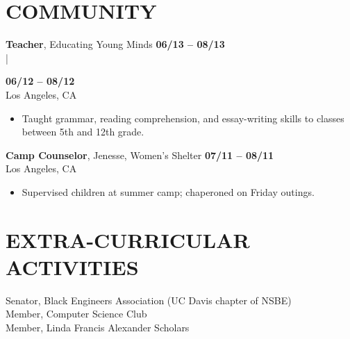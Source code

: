 \documentclass[line, letterpaper, 10pt]{res}
\begin{document}
\begin{resume}
\begin{itemize}
    \end{itemize}

\section{COMMUNITY}
    {\bf Teacher}, Educating Young Minds \hfill {\bf 06/13 -- 08/13} \\
    |\raggedright{\hfill {\bf 06/12 -- 08/12}} \\
    Los Angeles, CA
    \begin{itemize} \itemsep -2pt
        \item Taught grammar, reading comprehension, and essay-writing skills to classes between 5th and 12th grade.
    \end{itemize}

    {\bf Camp Counselor}, Jenesse, Women's Shelter \hfill {\bf 07/11 -- 08/11} \\
    Los Angeles, CA
    \begin{itemize} \itemsep -2pt %
        \item Supervised children at summer camp; chaperoned on Friday outings.
    \end{itemize}

\section{EXTRA-CURRICULAR ACTIVITIES}     
    Senator, Black Engineers Association (UC Davis chapter of NSBE) \\
    Member, Computer Science Club \\
    Member, Linda Francis Alexander Scholars \\
 

\end{resume}
\end{document}
